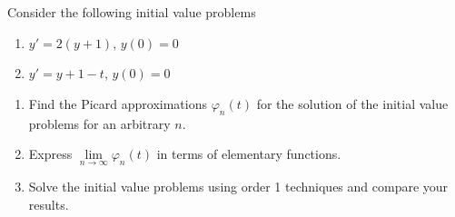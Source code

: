 \documentclass[fleqn, a4paper, 12pt, oneside]{amsart}
\theoremstyle{definition}
\theoremstyle{theorem}
\begin{document}
\begin{question}
	Consider the following initial value problems
	\begin{enumerate}[label = (\alph*)]
		\item $y' = 2 (y + 1)$, $y(0) = 0$
		\item $y' = y + 1 - t$, $y(0) = 0$
	\end{enumerate}
	\begin{enumerate}
		\item Find the Picard approximations $\varphi_n(t)$ for the solution of the initial value problems for an arbitrary $n$.
		\item Express $\lim\limits_{n \to \infty} \varphi_n(t)$ in terms of elementary functions.
		\item Solve the initial value problems using order 1 techniques and compare your results.
	\end{enumerate}
\end{question}
\end{document}
